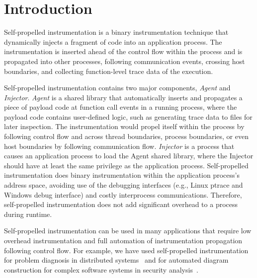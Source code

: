 \section{Introduction}
\label{sec-intro}

Self-propelled instrumentation is a binary instrumentation technique that
dynamically injects a fragment of code into an application process.
The instrumentation is inserted ahead of the control flow within the process and
is propagated into other processes, following communication events, crossing
host boundaries, and collecting function-level trace data of the execution.

Self-propelled instrumentation contains two major components, {\em Agent} and
{\em Injector}.
{\em Agent} is a shared library that automatically inserts and propagates a
piece of payload code at function call events in a running process, where the
payload code contains user-defined logic, such as generating trace data to files 
for later inspection.
The instrumentation would propel itself within the process by following control
flow and across thread boundaries, process boundaries, or even host boundaries
by following communication flow.
{\em Injector} is a process that causes an application process to load the Agent
shared library, where the Injector should have at least the same privilege as
the application process.
Self-propelled instrumentation does binary instrumentation within the
application process's address space, avoiding use of the debugging interfaces
(e.g., Linux ptrace and Windows debug interface) and costly interprocess
communications.
Therefore, self-propelled instrumentation does not add significant overhead to a
process during runtime.

Self-propelled instrumentation can be used in many applications that require low
overhead instrumentation and full automation of instrumentation propagation
following control flow.
For example, we have used self-propelled instrumentation for problem diagnosis
in distributed systems~\cite{Mirgorodskiy2006} and for automated diagram
construction for complex software systems in security analysis~\cite{Fang2012}.

